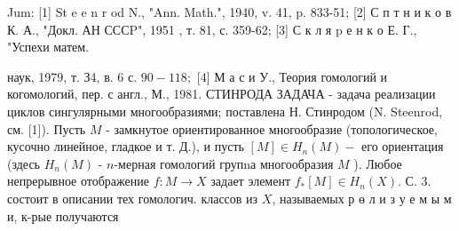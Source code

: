 \documentclass[10pt]{article}
\begin{document}
Jum: [1] St e e n r od N., "Ann. Math.", 1940, v. 41, p. 833-51; [2] С п т н и к о в К. А., "Докл. АН СССP", 1951 , т. 81, с. 359-62; [3] С к л я p е н к о Е. Г., "Успехи матем.

наук, 1979, т. З4, в. 6 с. $90-118 ;$ [4] М а с и У., Теория гомологий и когомологий, пер. с англ., М., 1981. СТИНРОДА ЗАДАЧА - задача реализации циклов сингулярными многообразиями; поставлена Н. Стинродом (N. Steenrod, см. [1]). Пусть $M$ - замкнутое ориентированное многообразие (топологическое, кусочно линейное, гладкое и т. Д.), и пусть $[M] \in H_{n}(M)-$ его ориентация (здесь $H_{n}(M)$ - $n$-мерная гомологий групnа многообразия $M$ ). Любое непрерывное отображение $f: M \rightarrow X$ задает элемент $f_{*}[M] \in H_{n}(X)$. С. 3. состоит в описании тех гомологич. классов из $X$, называемых р ө л и з у е м ы м и, к-рые получаются
\end{document}
